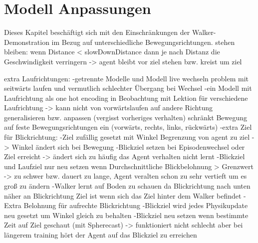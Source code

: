 \section{Modell Anpassungen}
Dieses Kapitel beschäftigt sich mit den Einschränkungen der Walker-Demonstration im Bezug auf unterschiedliche Bewegungsrichtungen.
stehen bleiben:
wenn Distance < slowDownDistance dann je nach Distanz die Geschwindigkeit verringern -> agent bleibt vor ziel stehen bzw. kreist um ziel

extra Laufrichtungen:
-getrennte Modelle und Modell live wechseln problem mit seitwärts laufen und vermutlich schlechter Übergang bei Wechsel
-ein Modell mit Laufrichtung als one hot encoding in Beobachtung mit Lektion für verschiedene Laufrichtung -> kann nicht von vorwärtslaufen auf andere Richtung generalisieren bzw. anpassen (vergisst vorheriges verhalten) schränkt Bewegung auf feste Bewegungsrichtungen ein (vorwärts, rechts, links, rückwärts)
-extra Ziel für Blickrichtung:
  -Ziel zufällig gesetzt mit Winkel Begrenzung von agent zu ziel -> Winkel ändert sich bei Bewegung
  -Blickziel setzen bei Episodenwechsel oder Ziel erreicht -> ändert sich zu häufig das Agent verhalten nicht lernt
  -Blickziel und Laufziel nur neu setzen wenn Durchschnittliche Blickbelohnung > Grenzwert -> zu schwer bzw. dauert zu lange, Agent veralten schon zu sehr vertieft um es groß zu ändern
  -Walker lernt auf Boden zu schauen da Blickrichtung nach unten näher an Blickrichtung Ziel ist wenn sich das Ziel hinter dem Walker befindet
  -Extra Belohnung für aufrechte Blickrichtung
  -Blickziel wird jedes Physikupdate neu gesetzt um Winkel gleich zu behalten
  -Blickziel neu setzen wenn bestimmte Zeit auf Ziel geschaut (mit Spherecast) -> funktioniert nicht schlecht aber bei längerem training hört der Agent auf das Blickziel zu erreichen